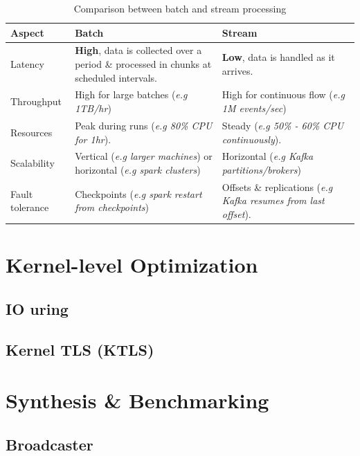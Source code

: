 \documentclass[11pt,a4paper]{article}
\begin{document}
	\begin{table}[h!]
		\centering
		\begin{tabular}{|l|p{6cm}|p{6cm}|}
			\hline
			\textbf{Aspect} & \textbf{Batch} & \textbf{Stream} \\
			\hline
			Latency & \textbf{High}, data is collected over a period \& processed in chunks at scheduled intervals. & \textbf{Low}, data is handled as it arrives. \\
			\hline
			Throughput & High for large batches (\textit{e.g 1TB/hr}) & High for continuous flow (\textit{e.g 1M events/sec}) \\
			\hline
			Resources & Peak during runs (\textit{e.g 80\% CPU for 1hr}). & Steady (\textit{e.g 50\% - 60\% CPU continuously}). \\
			\hline
			Scalability & Vertical (\textit{e.g larger machines}) or horizontal (\textit{e.g spark clusters}) & Horizontal (\textit{e.g Kafka partitions/brokers}) \\
			\hline
			Fault tolerance & Checkpoints (\textit{e.g spark restart from checkpoints}) & Offsets \& replications (\textit{e.g Kafka resumes from last offset}). \\
			\hline
		\end{tabular}
		\caption{Comparison between batch and stream processing}
	\end{table}
	
	\section{Kernel-level Optimization}
	\label{sec:background}
	\subsection{IO uring}
	
	\subsection{Kernel TLS (KTLS)}
	
	\section{Synthesis \& Benchmarking}
	\label{sec:background}
	\subsection{Broadcaster}
	
\end{document}
